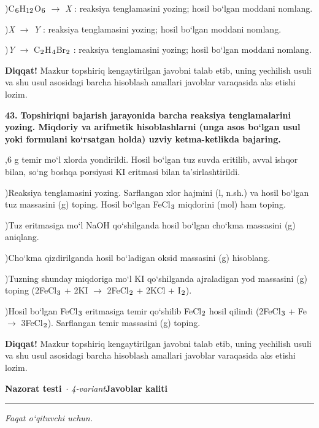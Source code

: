 \documentclass[11pt,a4paper]{article}
\renewcommand{\textsubscript}[1]{\ensuremath{_{\text{\fontsize{8}{8}\selectfont #1}}}}
\newcommand{\diqqat}[1]{\par\smallskip\noindent\textbf{Diqqat!} #1\par\medskip}
\begin{document}
)C\textsubscript{6}H\textsubscript{12}O\textsubscript{6} $\to$ \textit{X} : reaksiya tenglamasini yozing; hosil bo`lgan moddani nomlang.\par
{})\textit{X} $\to$ \textit{Y} : reaksiya tenglamasini yozing; hosil bo`lgan moddani nomlang.\par
{})\textit{Y} $\to$ C\textsubscript{2}H\textsubscript{4}Br\textsubscript{2} : reaksiya tenglamasini yozing; hosil bo`lgan moddani nomlang.\par
\diqqat{Mazkur topshiriq kengaytirilgan javobni talab etib, uning yechilish usuli va shu usul asosidagi barcha hisoblash amallari javoblar varaqasida aks etishi lozim.}
\noindent\textbf{43.} \textbf{Topshiriqni bajarish jarayonida barcha reaksiya tenglamalarini yozing. Miqdoriy va arifmetik hisoblashlarni (unga asos bo`lgan usul yoki formulani ko`rsatgan holda) uzviy ketma-ketlikda bajaring.}\par{},6 g temir mo`l xlorda yondirildi. Hosil bo`lgan tuz suvda eritilib, avval ishqor bilan, so`ng boshqa porsiyasi KI eritmasi bilan ta'sirlashtirildi.\par
{})Reaksiya tenglamasini yozing. Sarflangan xlor hajmini (l, n.sh.) va hosil bo`lgan tuz massasini (g) toping. Hosil bo`lgan FeCl\textsubscript{3} miqdorini (mol) ham toping.\par
{})Tuz eritmasiga mo`l NaOH qo`shilganda hosil bo`lgan cho`kma massasini (g) aniqlang.\par
{})Cho`kma qizdirilganda hosil bo`ladigan oksid massasini (g) hisoblang.\par
{})Tuzning shunday miqdoriga mo`l KI qo`shilganda ajraladigan yod massasini (g) toping (2FeCl\textsubscript{3} + 2KI $\to$ 2FeCl\textsubscript{2} + 2KCl + I\textsubscript{2}).\par
{})Hosil bo`lgan FeCl\textsubscript{3} eritmasiga temir qo`shilib FeCl\textsubscript{2} hosil qilindi (2FeCl\textsubscript{3} + Fe $\to$ 3FeCl\textsubscript{2}). Sarflangan temir massasini (g) toping.\par
\diqqat{Mazkur topshiriq kengaytirilgan javobni talab etib, uning yechilish usuli va shu usul asosidagi barcha hisoblash amallari javoblar varaqasida aks etishi lozim.}
\newpage
\noindent\textbf{\fontsize{13}{15}\selectfont Nazorat testi}\ \textit{$\cdot$ 4-variant}\hfill \textbf{Javoblar kaliti}\par\smallskip\hrule\smallskip
\textit{Faqat o`qituvchi uchun.}\par\medskip
\end{document}
